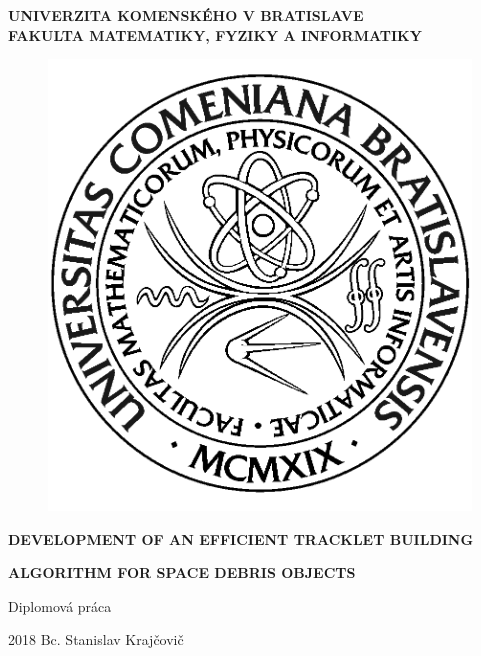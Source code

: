 \documentclass[12pt, a4paper, oneside]{book}
\newcommand{\mfthesistype}{Diplomová práca}
\newcommand{\mfauthor}{Bc. Stanislav Krajčovič}
\newcommand{\mfuniversity}{UNIVERZITA KOMENSKÉHO V BRATISLAVE}
\newcommand{\mffaculty}{FAKULTA MATEMATIKY, FYZIKY A INFORMATIKY}
\begin{document}
\frontmatter

\thispagestyle{empty}

\noindent
\begin{minipage}{\textwidth}
\begin{center}
\textbf{\mfuniversity \\
\mffaculty}
\end{center}
\end{minipage}

\vfill
\begin{figure}[!hbt]
	\begin{center}
		\includegraphics{images/logo_fmph}
		\label{img:logo}
	\end{center}
\end{figure}
\begin{center}
	\begin{minipage}{0.8\textwidth}
		\centerline{\textbf{\Large\MakeUppercase{Development of an efficient tracklet building }}}
		\smallskip
		\centerline{\textbf{\Large\MakeUppercase{algorithm for space debris objects}}}
		\smallskip
		\centerline{\mfthesistype}
	\end{minipage}
\end{center}
\vfill
2018 \hfill
\mfauthor
\eject 
\end{document}
